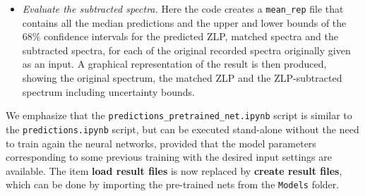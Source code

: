 \begin{itemize}
\item {\it Evaluate the subtracted spectra.}
%
Here the code creates a {\tt mean\_rep} file that contains
all the median predictions and the upper and lower bounds of the 68\% confidence intervals for 
the predicted ZLP, matched spectra and the subtracted spectra, for each of the original recorded
spectra originally given as an input. 
%
A graphical representation
of the result is then produced, showing the original spectrum, the matched
ZLP and the ZLP-subtracted spectrum including uncertainty bounds. 

\end{itemize}

We emphasize that the {\tt predictions\_pretrained\_net.ipynb} script is similar to the 
{\tt predictions.ipynb} script, but 
can be executed stand-alone
without the need to train again the neural networks, provided that
the model parameters corresponding to some previous training with
the desired input settings are available.
The item {\bf load result files} is now replaced by {\bf create result files}, 
which can be done by importing the pre-trained nets from the {\tt Models} folder. 



















